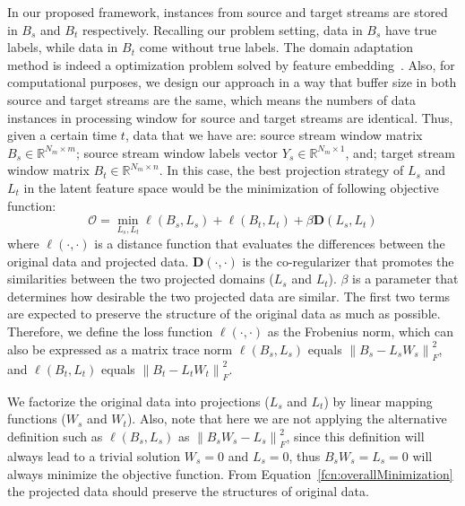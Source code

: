 In our proposed framework, instances from source and target streams are stored in $B_{s}$ and $B_{t}$ respectively. 
Recalling our problem setting, data in $B_{s}$ have true labels, while data in $B_t$ come without true labels. 
The domain adaptation method is indeed a optimization problem solved by feature embedding~\cite{shi2010transfer}.
Also, for computational purposes, we design our approach in a way that buffer size in both source and target streams are the same, which means the numbers of data instances in processing window for source and target streams are identical. 
Thus, given a certain time $t$, data that we have are: source stream window matrix $B_s \in \mathds{R}^{N_m \times m}$; source stream window labels vector $Y_{s} \in \mathds{R}^{N_m \times 1}$, and; target stream window matrix $B_t \in \mathds{R}^{N_m \times n}$. 
In this case, the best projection strategy of $L_{s}$ and $L_{t}$ in the latent feature space would be the minimization of following objective function:
\begin{equation}
\label{fcn:overallMinimization}
    \mathcal{O} = \min_{L_{s}, L_{t}}\ell\left ( B_s, L_{s} \right ) + \ell\left ( B_t, L_{t} \right ) + \beta \mathbf{D}\left(L_{s}, L_{t} \right )
\end{equation}
where $\ell\left(\cdot , \cdot \right)$ is a distance function that evaluates the differences between the original data and projected data. 
$\mathbf{D}\left(\cdot, \cdot\right)$ is the co-regularizer that promotes the similarities between the two projected domains ($L_{s}$ and $L_{t}$). $\beta$ is a parameter that determines how desirable the two projected data are similar.
The first two terms are expected to preserve the structure of the original data as much as possible. 
Therefore, we define the loss function $\ell\left(\cdot, \cdot\right)$ as the Frobenius norm, which can also be expressed as a matrix trace norm $\ell\left(B_s, L_{s}\right) $ equals $\left \| B_s - L_{s}W_{s}  \right \|_{F}^2$, and $\ell\left(B_t, L_{t}\right)$ equals $ \left \| B_t - L_{t}W_{t}  \right \|_{F}^2$.

We factorize the original data into projections ($L_{s}$ and $L_{t}$) by linear mapping functions ($W_{s}$ and $W_{t}$).
Also, note that here we are not applying the alternative definition such as $\ell\left(B_s,L_{s}\right) $ as $\left \| B_{s}W_{s} - L_{s}  \right \|_{F}^2$, since this definition will always lead to a trivial solution $W_{s} = 0$ and $L_{s} = 0$, thus $B_{s}W_{s} = L_{s} = 0$ will always minimize the objective function. From Equation~\ref{fcn:overallMinimization} the projected data should preserve the structures of original data.

